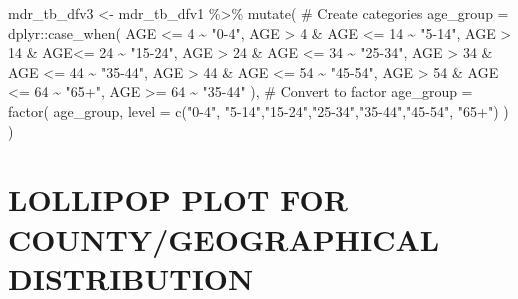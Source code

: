 \documentclass[
]{report}
\newenvironment{Shaded}{\begin{snugshade}}{\end{snugshade}}
\newcommand{\AttributeTok}[1]{\textcolor[rgb]{0.40,0.45,0.13}{#1}}
\newcommand{\CommentTok}[1]{\textcolor[rgb]{0.37,0.37,0.37}{#1}}
\newcommand{\DecValTok}[1]{\textcolor[rgb]{0.68,0.00,0.00}{#1}}
\newcommand{\FunctionTok}[1]{\textcolor[rgb]{0.28,0.35,0.67}{#1}}
\newcommand{\NormalTok}[1]{\textcolor[rgb]{0.00,0.23,0.31}{#1}}
\newcommand{\OtherTok}[1]{\textcolor[rgb]{0.00,0.23,0.31}{#1}}
\newcommand{\SpecialCharTok}[1]{\textcolor[rgb]{0.37,0.37,0.37}{#1}}
\newcommand{\StringTok}[1]{\textcolor[rgb]{0.13,0.47,0.30}{#1}}
\begin{document}
\begin{Shaded}
\begin{Highlighting}[]
\NormalTok{mdr\_tb\_dfv3 }\OtherTok{\textless{}{-}}\NormalTok{ mdr\_tb\_dfv1 }\SpecialCharTok{\%\textgreater{}\%}   \FunctionTok{mutate}\NormalTok{(}
  \CommentTok{\# Create categories}
  \AttributeTok{age\_group =}\NormalTok{ dplyr}\SpecialCharTok{::}\FunctionTok{case\_when}\NormalTok{(}
\NormalTok{    AGE }\SpecialCharTok{\textless{}=} \DecValTok{4}            \SpecialCharTok{\textasciitilde{}} \StringTok{"0{-}4"}\NormalTok{,}
\NormalTok{    AGE }\SpecialCharTok{\textgreater{}} \DecValTok{4} \SpecialCharTok{\&}\NormalTok{ AGE }\SpecialCharTok{\textless{}=} \DecValTok{14} \SpecialCharTok{\textasciitilde{}} \StringTok{"5{-}14"}\NormalTok{,}
\NormalTok{    AGE }\SpecialCharTok{\textgreater{}} \DecValTok{14} \SpecialCharTok{\&}\NormalTok{ AGE}\SpecialCharTok{\textless{}=} \DecValTok{24} \SpecialCharTok{\textasciitilde{}} \StringTok{"15{-}24"}\NormalTok{,}
\NormalTok{    AGE }\SpecialCharTok{\textgreater{}} \DecValTok{24} \SpecialCharTok{\&}\NormalTok{ AGE }\SpecialCharTok{\textless{}=} \DecValTok{34}  \SpecialCharTok{\textasciitilde{}} \StringTok{"25{-}34"}\NormalTok{,}
\NormalTok{    AGE }\SpecialCharTok{\textgreater{}} \DecValTok{34} \SpecialCharTok{\&}\NormalTok{ AGE }\SpecialCharTok{\textless{}=} \DecValTok{44} \SpecialCharTok{\textasciitilde{}} \StringTok{"35{-}44"}\NormalTok{,}
\NormalTok{    AGE }\SpecialCharTok{\textgreater{}} \DecValTok{44} \SpecialCharTok{\&}\NormalTok{ AGE }\SpecialCharTok{\textless{}=} \DecValTok{54} \SpecialCharTok{\textasciitilde{}} \StringTok{"45{-}54"}\NormalTok{,}
\NormalTok{    AGE }\SpecialCharTok{\textgreater{}} \DecValTok{54} \SpecialCharTok{\&}\NormalTok{ AGE }\SpecialCharTok{\textless{}=} \DecValTok{64} \SpecialCharTok{\textasciitilde{}} \StringTok{"65+"}\NormalTok{,}
\NormalTok{    AGE }\SpecialCharTok{\textgreater{}=} \DecValTok{64} \SpecialCharTok{\textasciitilde{}} \StringTok{"35{-}44"}
\NormalTok{  ),}
  \CommentTok{\# Convert to factor}
  \AttributeTok{age\_group =} \FunctionTok{factor}\NormalTok{(}
\NormalTok{    age\_group,}
    \AttributeTok{level =} \FunctionTok{c}\NormalTok{(}\StringTok{"0{-}4"}\NormalTok{, }\StringTok{"5{-}14"}\NormalTok{,}\StringTok{"15{-}24"}\NormalTok{,}\StringTok{"25{-}34"}\NormalTok{,}\StringTok{"35{-}44"}\NormalTok{,}\StringTok{"45{-}54"}\NormalTok{, }\StringTok{"65+"}\NormalTok{)}
\NormalTok{  )}
\NormalTok{)}
\end{Highlighting}
\end{Shaded}

\hypertarget{lollipop-plot-for-countygeographical-distribution}{%
\section{LOLLIPOP PLOT FOR COUNTY/GEOGRAPHICAL
DISTRIBUTION}\label{lollipop-plot-for-countygeographical-distribution}}
\end{document}
